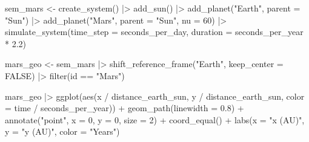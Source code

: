 \documentclass[
  10.5pt,
  letterpaper,
]{scrbook}
\newenvironment{Shaded}{\begin{snugshade}}{\end{snugshade}}
\newcommand{\AttributeTok}[1]{\textcolor[rgb]{0.00,0.00,0.00}{#1}}
\newcommand{\ConstantTok}[1]{\textcolor[rgb]{0.00,0.00,0.00}{#1}}
\newcommand{\DecValTok}[1]{\textcolor[rgb]{0.00,0.00,0.00}{#1}}
\newcommand{\FloatTok}[1]{\textcolor[rgb]{0.00,0.00,0.00}{#1}}
\newcommand{\FunctionTok}[1]{\textcolor[rgb]{0.00,0.00,0.00}{#1}}
\newcommand{\NormalTok}[1]{\textcolor[rgb]{0.00,0.00,0.00}{#1}}
\newcommand{\OtherTok}[1]{\textcolor[rgb]{0.00,0.00,0.00}{#1}}
\newcommand{\SpecialCharTok}[1]{\textcolor[rgb]{0.00,0.00,0.00}{#1}}
\newcommand{\StringTok}[1]{\textcolor[rgb]{0.00,0.00,0.00}{#1}}
\theoremstyle{definition}
\theoremstyle{plain}
\theoremstyle{remark}
\begin{document}
\begin{Shaded}
\begin{Highlighting}[]
\NormalTok{sem\_mars }\OtherTok{\textless{}{-}} \FunctionTok{create\_system}\NormalTok{() }\SpecialCharTok{|\textgreater{}}
  \FunctionTok{add\_sun}\NormalTok{() }\SpecialCharTok{|\textgreater{}}
  \FunctionTok{add\_planet}\NormalTok{(}\StringTok{"Earth"}\NormalTok{, }\AttributeTok{parent =} \StringTok{"Sun"}\NormalTok{) }\SpecialCharTok{|\textgreater{}}
  \FunctionTok{add\_planet}\NormalTok{(}\StringTok{"Mars"}\NormalTok{,  }\AttributeTok{parent =} \StringTok{"Sun"}\NormalTok{, }\AttributeTok{nu =} \DecValTok{60}\NormalTok{) }\SpecialCharTok{|\textgreater{}}
  \FunctionTok{simulate\_system}\NormalTok{(}\AttributeTok{time\_step =}\NormalTok{ seconds\_per\_day, }\AttributeTok{duration =}\NormalTok{ seconds\_per\_year }\SpecialCharTok{*} \FloatTok{2.2}\NormalTok{)}

\NormalTok{mars\_geo }\OtherTok{\textless{}{-}}\NormalTok{ sem\_mars }\SpecialCharTok{|\textgreater{}}
  \FunctionTok{shift\_reference\_frame}\NormalTok{(}\StringTok{"Earth"}\NormalTok{, }\AttributeTok{keep\_center =} \ConstantTok{FALSE}\NormalTok{) }\SpecialCharTok{|\textgreater{}}
  \FunctionTok{filter}\NormalTok{(id }\SpecialCharTok{==} \StringTok{"Mars"}\NormalTok{)}
\end{Highlighting}
\end{Shaded}

\begin{Shaded}
\begin{Highlighting}[]
\NormalTok{mars\_geo }\SpecialCharTok{|\textgreater{}}
  \FunctionTok{ggplot}\NormalTok{(}\FunctionTok{aes}\NormalTok{(x }\SpecialCharTok{/}\NormalTok{ distance\_earth\_sun, y }\SpecialCharTok{/}\NormalTok{ distance\_earth\_sun,}
             \AttributeTok{color =}\NormalTok{ time }\SpecialCharTok{/}\NormalTok{ seconds\_per\_year)) }\SpecialCharTok{+}
  \FunctionTok{geom\_path}\NormalTok{(}\AttributeTok{linewidth =} \FloatTok{0.8}\NormalTok{) }\SpecialCharTok{+}
  \FunctionTok{annotate}\NormalTok{(}\StringTok{"point"}\NormalTok{, }\AttributeTok{x =} \DecValTok{0}\NormalTok{, }\AttributeTok{y =} \DecValTok{0}\NormalTok{, }\AttributeTok{size =} \DecValTok{2}\NormalTok{) }\SpecialCharTok{+}
  \FunctionTok{coord\_equal}\NormalTok{() }\SpecialCharTok{+}
  \FunctionTok{labs}\NormalTok{(}\AttributeTok{x =} \StringTok{"x (AU)"}\NormalTok{, }\AttributeTok{y =} \StringTok{"y (AU)"}\NormalTok{, }\AttributeTok{color =} \StringTok{"Years"}\NormalTok{)}
\end{Highlighting}
\end{Shaded}
\end{document}
